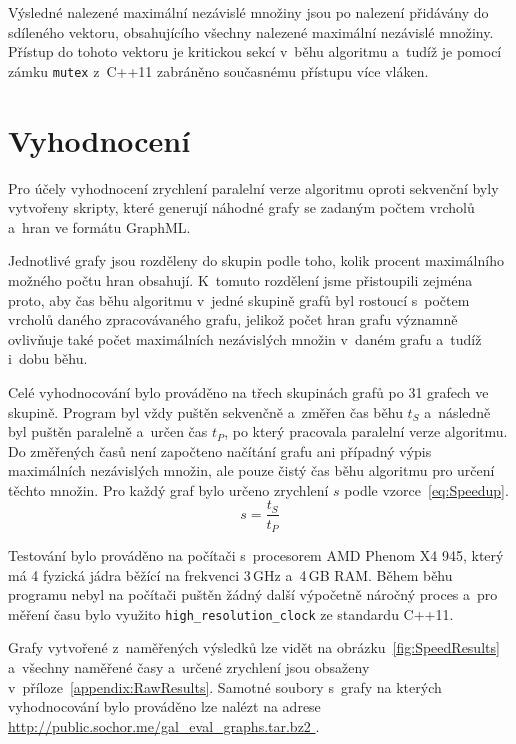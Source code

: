 \documentclass[12pt]{article}
\begin{document}
Výsledné nalezené maximální nezávislé množiny jsou po nalezení přidávány do sdíleného vektoru, obsahujícího všechny nalezené maximální nezávislé množiny. Přístup do tohoto vektoru je kritickou sekcí v~běhu algoritmu a~tudíž je pomocí zámku \texttt{mutex} z~C++11 zabráněno současnému přístupu více vláken.




\section{Vyhodnocení} \label{sec:Evaluation}
Pro účely vyhodnocení zrychlení paralelní verze algoritmu oproti sekvenční byly vytvořeny skripty, které generují náhodné grafy se zadaným počtem vrcholů a~hran ve formátu GraphML. 

Jednotlivé grafy jsou rozděleny do skupin podle toho, kolik procent maximálního možného počtu hran obsahují. K~tomuto rozdělení jsme přistoupili zejména proto, aby čas běhu algoritmu v~jedné skupině grafů byl rostoucí s~počtem vrcholů daného zpracovávaného grafu, jelikož počet hran grafu významně ovlivňuje také počet maximálních nezávislých množin v~daném grafu a~tudíž i~dobu běhu. 

Celé vyhodnocování bylo prováděno na třech skupinách grafů po 31 grafech ve skupině. Program byl vždy puštěn sekvenčně a~změřen čas běhu $t_S$ a~následně byl puštěn paralelně a~určen čas $t_P$, po který pracovala paralelní verze algoritmu. Do změřených časů není započteno načítání grafu ani případný výpis maximálních nezávislých množin, ale pouze čistý čas běhu algoritmu pro určení těchto množin. Pro každý graf bylo určeno zrychlení $s$ podle vzorce~\ref{eq:Speedup}.
\begin{equation}
    s = \frac{t_S}{t_P} \label{eq:Speedup}
\end{equation}

Testování bylo prováděno na počítači s~procesorem AMD Phenom X4 945, který má 4 fyzická jádra běžící na frekvenci 3\,GHz a~4\,GB RAM. Během běhu programu nebyl na počítači puštěn žádný další výpočetně náročný proces a~pro měření času bylo využito \texttt{high\_resolution\_clock} ze standardu C++11.

Grafy vytvořené z~naměřených výsledků lze vidět na obrázku~\ref{fig:SpeedResults} a~všechny naměřené časy a~určené zrychlení jsou obsaženy v~příloze~\ref{appendix:RawResults}. Samotné soubory s~grafy na kterých vyhodnocování bylo prováděno lze nalézt na adrese \url{http://public.sochor.me/gal\_eval\_graphs.tar.bz2
}.
\end{document}
